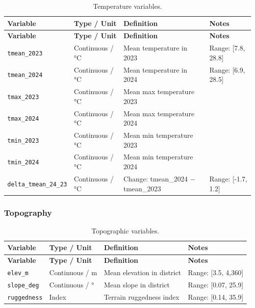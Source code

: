 \documentclass[11pt,a4paper]{article}
\begin{document}
\begin{longtable}{L{2.5cm}L{2.5cm}L{5.5cm}L{3.5cm}}
\caption{Temperature variables.} \\
\toprule
\textbf{Variable} & \textbf{Type / Unit} & \textbf{Definition} & \textbf{Notes} \\
\midrule
\endfirsthead
\toprule
\textbf{Variable} & \textbf{Type / Unit} & \textbf{Definition} & \textbf{Notes} \\
\midrule
\endhead
\bottomrule
\endlastfoot
\texttt{tmean\_2023} & Continuous / °C & Mean temperature in 2023 & Range: [7.8, 28.8] \\
\texttt{tmean\_2024} & Continuous / °C & Mean temperature in 2024 & Range: [6.9, 28.5] \\
\texttt{tmax\_2023} & Continuous / °C & Mean max temperature 2023 & \\
\texttt{tmax\_2024} & Continuous / °C & Mean max temperature 2024 & \\
\texttt{tmin\_2023} & Continuous / °C & Mean min temperature 2023 & \\
\texttt{tmin\_2024} & Continuous / °C & Mean min temperature 2024 & \\
\texttt{delta\_tmean\_24\_23} & Continuous / °C & Change: tmean\_2024 $-$ tmean\_2023 & Range: [-1.7, 1.2] \\
\end{longtable}

\subsubsection{Topography}

\begin{longtable}{L{2.5cm}L{2.5cm}L{5.5cm}L{3.5cm}}
\caption{Topographic variables.} \\
\toprule
\textbf{Variable} & \textbf{Type / Unit} & \textbf{Definition} & \textbf{Notes} \\
\midrule
\endfirsthead
\toprule
\textbf{Variable} & \textbf{Type / Unit} & \textbf{Definition} & \textbf{Notes} \\
\midrule
\endhead
\bottomrule
\endlastfoot
\texttt{elev\_m} & Continuous / m & Mean elevation in district & Range: [3.5, 4,360] \\
\texttt{slope\_deg} & Continuous / ° & Mean slope in district & Range: [0.07, 25.9] \\
\texttt{ruggedness} & Index & Terrain ruggedness index & Range: [0.14, 35.9] \\
\end{longtable}
\end{document}
